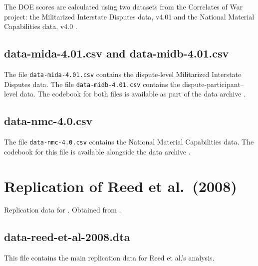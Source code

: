 \documentclass[12pt]{article}
\begin{document}
The DOE scores are calculated using two datasets from the Correlates of War project: the Militarized Interstate Disputes data, v4.01 \citep{Palmer:2015hp} and the National Material Capabilities data, v4.0 \citep{singer1972}.

\subsection{data-mida-4.01.csv and data-midb-4.01.csv}

The file \texttt{data-mida-4.01.csv} contains the dispute-level Militarized Interstate Disputes data.
The file \texttt{data-midb-4.01.csv} contains the dispute-participant--level data.
The codebook for both files is available as part of the data archive \citep{mid_data}.

\subsection{data-nmc-4.0.csv}

The file \texttt{data-nmc-4.0.csv} contains the National Material Capabilities data.
The codebook for this file is available alongside the data archive \citep{nmc_data}.


\section{Replication of Reed et al.\ (2008)}

Replication data for \citet{reed2008war}.
Obtained from \citet{reed2008data}.

\subsection{data-reed-et-al-2008.dta}

This file contains the main replication data for Reed et al.'s analysis.
\end{document}
